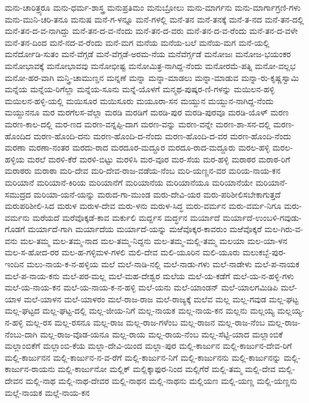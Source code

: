 {ಮನು-ಚಾರಿತ್ರ್ಯರೂ
ಮನು-ಧರ್ಮ-ಶಾಸ್ತ್ರ
ಮನುಪ್ರತಿಮಂ
ಮನುಬ್ರೋಲು
ಮನು-ಮಾರ್ಗನು
ಮನು-ಮಾರ್ಗಾಗ್ರಣಿ-ಗಳು
ಮನು-ಮುನಿ-ಚರಿ-ತನೂ
ಮನುಷ
ಮನೆ-ಗ-ಳನ್ನೂ
ಮನೆ-ಗಳಲ್ಲಿ
ಮನೆ-ತನ
ಮನೆ-ತನಕ್ಕೆ
ಮನೆ-ತ-ನದ
ಮನೆ-ತನ-ದಲ್ಲಿ
ಮನೆ-ತನ-ದ-ವ-ನಾಗಿದ್ದು
ಮನೆ-ತನ-ದ-ವ-ನೆಂದು
ಮನೆ-ತನ-ದ-ವರು
ಮನೆ-ತನ-ದ-ವ-ರೆಂದು
ಮನೆ-ತನ-ದ-ವಳೇ
ಮನೆ-ತನ-ದಿಂದ
ಮನೆ-ನದ-ವ-ರೆಂದು
ಮನೆ-ಮಗ
ಮನೆಯ
ಮನೆಯ-ಬಲೆ
ಮನೆಯ-ಮಗ
ಮನೆ-ಯಲ್ಲಿ
ಮನೆರ್ದೋಡಿ-ಸುತಂ
ಮನೆ-ವೆಗ್ಗಡೆ
ಮನೆ-ವೆಗ್ಗಡೆ-ಅರಮ-ನೆಯ
ಮನೆವೆರ್ಗ್ಗಡೆ
ಮನೋಜಃ
ಮನೋಜ-ಭಯಂಕರ
ಮನೋಭಾವಕ್ಕೆ
ಮನೋಭಾವವು
ಮನೋಭೀಷ್ಟ
ಮನೋಮಿತ್ರ-ನಾಗಿದ್ದ-ನೆಂದು
ಮನೋರಮೆ-ಪತ್ನಿ
ಮನೋ-ವಲ್ಲಭ
ಮನೋ-ಹರ-ವಾಗಿ
ಮನ್ತ್ರಿ-ಚಾಮುಣ್ಡನ
ಮನ್ನಣೆ
ಮನ್ನಾ
ಮನ್ನಾ-ಮಾಡಲು
ಮನ್ನಾ-ಮಾಡುವ
ಮನ್ನಾ-ರು-ಕೃಷ್ಣಸ್ವಾಮಿ
ಮನ್ನೆಯ
ಮನ್ನೆಯ-ರಿಗೆಲ್ಲಾ
ಮನ್ನೆಯ-ಸೂನು
ಮನ್ನೆ-ಯೊಳಗೆ
ಮನ್ಮಥ-ಪುಷ್ಕರ-ಣಿ-ಗಳನ್ನು
ಮಯಿಲನ-ಹಳ್ಳಿ
ಮಯಿಲನ-ಹಳ್ಳಿ-ಯಲ್ಲಿ
ಮಯಿಸೂರ
ಮಯಿಸೂರು
ಮಯೂರಾ-ಸನ
ಮಯ್ದುನ
ಮಯ್ದುನ-ನಾಗಿದ್ದ-ನೆಂದು
ಮಯ್ದುನನೂ
ಮರ
ಮರಗೆಲಸ-ವೆಲ್ಲಾ
ಮರಡಿ
ಮರಡಿಗೆ
ಮರಡಿ-ಪುರ
ಮರಡಿ-ಪುರವೂ
ಮರಡಿ-ಯೊಳ್
ಮರಣ
ಮರಣ-ಕಾಲ-ದಲ್ಲಿ
ಮರ-ಣದ
ಮರಣ-ವನ್ನಪ್ಪಿ-ದಾಗ
ಮರಣ-ವನ್ನು
ಮರಣ-ವನ್ನೇ
ಮರಣ-ಶಾ-ಸನ-ದಲ್ಲಿ
ಮರಣ-ಹೊಂದಿದ
ಮರಣ-ಹೊಂದಿ-ದನು
ಮರಣ-ಹೊಂದಿ-ದ-ನೆಂದು
ಮರಣ-ಹೊಂದಿ-ದ-ವರ
ಮರಣ-ಹೊಂದಿ-ನೆಂದು
ಮರಣಾ
ಮರಣಾ-ನಂತರ
ಮರದು-ರಾದ
ಮರದೂರ-ಮದ್ದೂರ
ಮರದೂ-ರಾದ-ಮದ್ದೂರು
ಮರಲ-ಹಳ್ಳಿ
ಮರಲ-ಹಳ್ಳಿಯ
ಮರಲೆ
ಮರಳಿ-ಕೆರೆ
ಮರಳಿ-ಬಿಟ್ಟು
ಮರಳಿಸಿ
ಮರ-ವೂರ
ಮರ-ಸೆಯ
ಮರ-ಹಳ್ಳಿ
ಮರಾಠರ
ಮರಾಠ-ರಿಗೆ
ಮರಾಠರು
ಮರಾಠಾ
ಮರಿ-ದೇವ
ಮರಿ-ದೇವ-ರಾಜ-ವಡೆಯ-ನೆಂಬ
ಮರಿ-ಯಣ್ಣನ-ವರ
ಮರಿಯ-ನಾಯ-ಕನ
ಮರಿಯಾನೆ
ಮರಿಯಾನೆ-ಕಿರಿಯ
ಮರಿಯಾನೆಗೆ
ಮರಿಯಾನೆಯ
ಮರಿಯಾನೆಯೂ
ಮರಿಯಾನೆಯೇ
ಮರಿಯಾನೆ-ಸಮುದ್ರದ
ಮರಿಯಾ-ಯನೆ-ಯನ್ನು
ಮರುದ-ಗಾ-ಮುಂಡ
ಮರು-ದೇವಿ-ಯರ
ಮರು-ಪರಿಶೀಲಿಸಬೇಕಾಗುತ್ತದೆ
ಮರುಪರಿಶೀಲಿ-ಸಿದ
ಮರುಳ
ಮರುಳ-ದೇವ
ಮರು-ಳನು
ಮರುಳ-ಸಿದ್ಧ
ಮರು-ವರ್ಮನ
ಮರು-ವರ್ಮ-ನಿಗೂ
ಮರು-ವರ್ಮನು
ಮರೆಯದೆ
ಮರೆವೊಕ್ಕಡೆ-ಕಾವ
ಮರ್ಕುಲಿ
ಮರ್ದ್ದಸ
ಮರ್ದ್ಧನ
ಮರ್ಯಾದೆ
ಮರ್ಯಾದೆ-ಉಂಬಳಿ-ಗವುಡು-ಗೊಡಗೆ
ಮರ್ಯಾದೆ-ಗಾಗಿ
ಮರ್ಯಾದೆಯ
ಮರ್ಯಾದೆ-ಯನ್ನು
ಮಱೆವೊಕ್ಕರ-ಕಾವರುಂ
ಮಱೆವೊಕ್ಕರೆ
ಮಲ-ಗಿರು-ವ-ವನು
ಮಲ-ತಮ್ಮ
ಮಲ-ತಮ್ಮ-ನಾದ
ಮಲ-ತಮ್ಮ-ನಿದ್ದನು
ಮಲ-ತಮ್ಮ-ಮಲ್ಲಿ-ತಮ್ಮ
ಮಲಯಾ
ಮಲ-ಯಾ-ಳನ
ಮಲ-ಸ-ಹೋದ-ರರ
ಮಲ-ಹ-ಗಳ್ಳಿಮಳ-ಗಳಲಿ
ಮಲಿ-ದೇವ
ಮಲಿ-ಯೂರಿನ
ಮಲಿ-ಯೂರು
ಮಲುಕಬ್ಬೆ-ಪುರ-ಇಂದಿನ
ಮಲು-ನಾಯ-ಕ-ನ-ಹಳ್ಳಿಯ
ಮಲೆ
ಮಲೆ-ನಾಡಿ-ನಲ್ಲಿ
ಮಲೆ-ನಾಡು-ಗಳು
ಮಲೆ-ನಾಡೇಳು
ಮಲೆ-ಪ-ನಾಯಕ
ಮಲೆ-ಪ-ನಾಯ-ಕನು
ಮಲೆ-ಪರ-ಮಲ್ಲ
ಮಲೆ-ಮಹ-ದೇಶ್ವರ
ಮಲೆಯ
ಮಲೆ-ಯ-ಕಡೆಗೆ
ಮಲೆ-ಯ-ನ-ಹಳ್ಳಿ-ಗಳು
ಮಲೆ-ಯ-ನಾಯ-ಕನ
ಮಲೆ-ಯ-ನಾಯ-ಕ-ನ-ಹಳ್ಳಿ
ಮಲೆ-ಯನು
ಮಲೆ-ಯಾಂಡನ್
ಮಲೆ-ಯಾಲಗಮಿಡಿಪಿ
ಮಲೆ-ಯಾಳ
ಮಲೆ-ಯಾಳನ
ಮಲೆ-ಯಾಳರಂ
ಮಲೆ-ರಾಜ-ರಾಜ
ಮಲೆ-ರಾಜ್ಯಕ್ಕೆ
ಮಲೆವ
ಮಲ್ಲ
ಮಲ್ಲ-ಗವುಡ
ಮಲ್ಲ-ಘಟ್ಟ
ಮಲ್ಲ-ಘಟ್ಟದ
ಮಲ್ಲ-ಘಟ್ಟ-ದಲ್ಲಿ
ಮಲ್ಲ-ಜೀಯ-ನಿಗೆ
ಮಲ್ಲ-ನಾಯಕ
ಮಲ್ಲ-ನಾಯ-ಕನ
ಮಲ್ಲನು
ಮಲ್ಲಯ್ಯ
ಮಲ್ಲಯ್ಯ-ನ-ಹಳ್ಳಿ
ಮಲ್ಲ-ರಸ
ಮಲ್ಲ-ರಸನೂ
ಮಲ್ಲ-ರಾಜ
ಮಲ್ಲ-ರಾಜ-ಗಳೆಂಬ
ಮಲ್ಲ-ರಾಜನ
ಮಲ್ಲ-ರಾಜ-ನೆಂಬ
ಮಲ್ಲ-ರಾಜ-ನೆಂಬು-ದಾಗಿ
ಮಲ್ಲ-ರಾಜ-ವೊಡ-ಯನೂ
ಮಲ್ಲ-ರಾಯ
ಮಲ್ಲ-ರಾಯ-ನೆಂಬ
ಮಲ್ಲ-ಸೆಟ್ಟಿ-ಯಾದ
ಮಲ್ಲಾಂಬಿಕೆ
ಮಲ್ಲಾಂಬಿಕೆಗೆ
ಮಲ್ಲಾಂಬಿ-ಕೆಯ
ಮಲ್ಲಾ-ದೇವಿ-ಯಿಂದ
ಮಲ್ಲಾ-ಪುರ
ಮಲ್ಲಿ-ಕಾರ್ಜುನ
ಮಲ್ಲಿ-ಕಾರ್ಜುನ-ದೇವ-ರಿಗೆ
ಮಲ್ಲಿ-ಕಾರ್ಜುನನ
ಮಲ್ಲಿ-ಕಾರ್ಜುನ-ನ-ವ-ರೆಗೆ
ಮಲ್ಲಿ-ಕಾರ್ಜುನ-ನಿಗೆ
ಮಲ್ಲಿ-ಕಾರ್ಜುನನು
ಮಲ್ಲಿ-ಕಾರ್ಜುನನ್ನು
ಮಲ್ಲಿ-ಕಾರ್ಜುನ-ರಾಯನು
ಮಲ್ಲಿ-ಕಾರ್ಜುನೋ
ಮಲ್ಲಿಕ್
ಮಲ್ಲಿಕ್ಕಾಫುರ-ನಿಂದ
ಮಲ್ಲಿಗೆರೆ
ಮಲ್ಲಿ-ತಮ್ಮ
ಮಲ್ಲಿ-ದೇವ
ಮಲ್ಲಿ-ದೇವನ
ಮಲ್ಲಿ-ನಾಥ
ಮಲ್ಲಿ-ನಾಥ-ದೇವರ
ಮಲ್ಲಿ-ನಾಥನ
ಮಲ್ಲಿ-ನಾಥನು
ಮಲ್ಲಿಯಣ
ಮಲ್ಲಿ-ಯಣ್ಣ
ಮಲ್ಲಿ-ಯಣ್ಣನು
ಮಲ್ಲೆ-ನಾಯಕ
ಮಲ್ಲೆ-ನಾಯ-ಕನ
}

